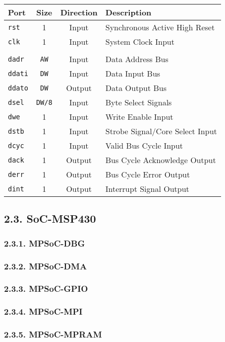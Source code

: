 \documentclass[]{article}
\begin{document}
\begin{longtable}[]{@{}lccl@{}}
\toprule
Port & Size & Direction & Description\tabularnewline
\midrule
\endhead
\texttt{rst} & 1 & Input & Synchronous Active High Reset\tabularnewline
\texttt{clk} & 1 & Input & System Clock Input\tabularnewline
& & &\tabularnewline
\texttt{dadr} & \texttt{AW} & Input & Data Address Bus\tabularnewline
\texttt{ddati} & \texttt{DW} & Input & Data Input Bus\tabularnewline
\texttt{ddato} & \texttt{DW} & Output & Data Output Bus\tabularnewline
\texttt{dsel} & \texttt{DW/8} & Input & Byte Select
Signals\tabularnewline
\texttt{dwe} & 1 & Input & Write Enable Input\tabularnewline
\texttt{dstb} & 1 & Input & Strobe Signal/Core Select
Input\tabularnewline
\texttt{dcyc} & 1 & Input & Valid Bus Cycle Input\tabularnewline
\texttt{dack} & 1 & Output & Bus Cycle Acknowledge Output\tabularnewline
\texttt{derr} & 1 & Output & Bus Cycle Error Output\tabularnewline
\texttt{dint} & 1 & Output & Interrupt Signal Output\tabularnewline
\bottomrule
\end{longtable}

\hypertarget{soc-msp430}{%
\subsection{2.3. SoC-MSP430}\label{soc-msp430}}

\hypertarget{mpsoc-dbg}{%
\subsubsection{2.3.1. MPSoC-DBG}\label{mpsoc-dbg}}

\hypertarget{mpsoc-dma}{%
\subsubsection{2.3.2. MPSoC-DMA}\label{mpsoc-dma}}

\hypertarget{mpsoc-gpio}{%
\subsubsection{2.3.3. MPSoC-GPIO}\label{mpsoc-gpio}}

\hypertarget{mpsoc-mpi}{%
\subsubsection{2.3.4. MPSoC-MPI}\label{mpsoc-mpi}}

\hypertarget{mpsoc-mpram}{%
\subsubsection{2.3.5. MPSoC-MPRAM}\label{mpsoc-mpram}}
\end{document}
